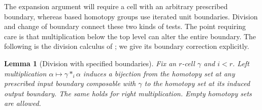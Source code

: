 \documentclass[11pt,letterpaper]{article}
\numberwithin{equation}{section}
\theoremstyle{plain}
\newtheorem{lemma}[theorem]{Lemma}
\theoremstyle{definition}
\theoremstyle{remark}
\begin{document}
The expansion argument will require a cell with an arbitrary prescribed
boundary, whereas based homotopy groups use iterated unit boundaries.
Division and change of boundary connect these two kinds of tests.
The point requiring care is that multiplication below the top level
can alter the entire boundary.  The following is the division
calculus of \cite[Lemma~4.12]{Ara2013}; we give its boundary correction
explicitly.

\begin{lemma}[Division with specified boundaries]\label{lem:prelim-division}
Fix an $r$-cell $\gamma$ and $i<r$.  Left multiplication
$\alpha\mapsto\gamma*_i\alpha$ induces a bijection from the
homotopy set at any prescribed input boundary composable with $\gamma$
to the homotopy set
at its induced output boundary.  The same holds for right
multiplication.  Empty homotopy sets are allowed.
\end{lemma}
\end{document}
